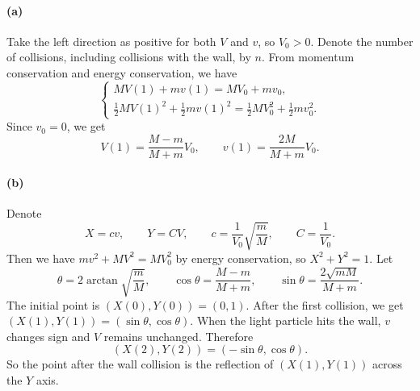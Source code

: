 \documentclass{article}
\begin{document}
\begin{solution}
	\paragraph{(a)} Take the left direction as positive for both $V$ and $v$, so $V_0 > 0$. Denote the number of collisions, including collisions with the wall, by $n$. From momentum conservation and energy conservation, we have
	\[
		\begin{cases}
			M V(1) + m v(1) = M V_0 + m v_0, \\
			\frac12 M V(1)^2 + \frac12 m v(1)^2 = \frac12 M V_0^2 + \frac12 m v_0^2.
		\end{cases}
	\]
	Since $v_0 = 0$, we get
	\[
		V(1) = \frac{M-m}{M+m}V_0, \qquad v(1) = \frac{2M}{M+m}V_0.
	\]

	\paragraph{(b)} Denote
	\[
		X = cv, \qquad Y = CV, \qquad c = \frac{1}{V_0}\sqrt{\frac{m}{M}}, \qquad C = \frac{1}{V_0}.
	\]
	Then we have $m v^2 + M V^2 = M V_0^2$ by energy conservation, so $X^2 + Y^2 = 1$. Let
	\[
		\theta = 2\arctan\sqrt{\frac{m}{M}}, \qquad
		\cos\theta = \frac{M-m}{M+m}, \qquad \sin\theta = \frac{2\sqrt{mM}}{M+m}.
	\]
	The initial point is $(X(0),Y(0)) = (0,1)$. After the first collision, we get $(X(1),Y(1)) = (\sin\theta,\cos\theta)$. When the light particle hits the wall, $v$ changes sign and $V$ remains unchanged. Therefore
	\[
		(X(2),Y(2)) = (-\sin\theta,\cos\theta).
	\]
	So the point after the wall collision is the reflection of $(X(1),Y(1))$ across the $Y$ axis.


\end{solution}
\end{document}
